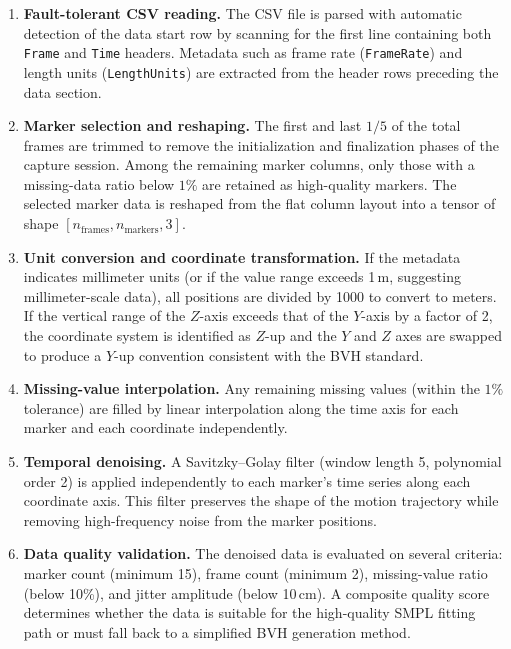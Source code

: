 \begin{enumerate}
    \item \textbf{Fault-tolerant CSV reading.} The CSV file is parsed with automatic detection of the data start row by scanning for the first line containing both \texttt{Frame} and \texttt{Time} headers. Metadata such as frame rate (\texttt{FrameRate}) and length units (\texttt{LengthUnits}) are extracted from the header rows preceding the data section.

    \item \textbf{Marker selection and reshaping.} The first and last $1/5$ of the total frames are trimmed to remove the initialization and finalization phases of the capture session. Among the remaining marker columns, only those with a missing-data ratio below $1\%$ are retained as high-quality markers. The selected marker data is reshaped from the flat column layout into a tensor of shape $[n_{\text{frames}}, n_{\text{markers}}, 3]$.

    \item \textbf{Unit conversion and coordinate transformation.} If the metadata indicates millimeter units (or if the value range exceeds 1\,m, suggesting millimeter-scale data), all positions are divided by 1000 to convert to meters. If the vertical range of the $Z$-axis exceeds that of the $Y$-axis by a factor of 2, the coordinate system is identified as $Z$-up and the $Y$ and $Z$ axes are swapped to produce a $Y$-up convention consistent with the BVH standard.

    \item \textbf{Missing-value interpolation.} Any remaining missing values (within the $1\%$ tolerance) are filled by linear interpolation along the time axis for each marker and each coordinate independently.

    \item \textbf{Temporal denoising.} A Savitzky--Golay filter (window length 5, polynomial order 2) is applied independently to each marker's time series along each coordinate axis. This filter preserves the shape of the motion trajectory while removing high-frequency noise from the marker positions.

    \item \textbf{Data quality validation.} The denoised data is evaluated on several criteria: marker count (minimum 15), frame count (minimum 2), missing-value ratio (below 10\%), and jitter amplitude (below 10\,cm). A composite quality score determines whether the data is suitable for the high-quality SMPL fitting path or must fall back to a simplified BVH generation method.


\end{enumerate}
